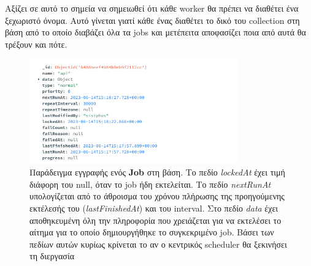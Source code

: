 Αξίζει σε αυτό το σημεία να σημειωθεί ότι κάθε worker θα πρέπει να διαθέτει ένα ξεχωριστό όνομα.
Αυτό γίνεται γιατί κάθε ένας διαθέτει το δικό του collection στη βάση από το οποίο διαβάζει όλα τα jobs
και μετέπειτα αποφασίζει ποια από αυτά θα τρέξουν και πότε.

\begin{figure}[!ht]
	\centering
	\includegraphics[width=0.8\textwidth]{./images/chapter4/sample_job_document.png}
	\caption[Παράδειγμα εγγραφής ενός \textbf{Job} στη βάση]{Παράδειγμα εγγραφής ενός \textbf{Job} στη βάση. Tο πεδίο \textit{lockedAt} έχει τιμή διάφορη του null, όταν το job ήδη εκτελείται.
		Το πεδίο \textit{nextRunAt} υπολογίζεται από το άθροισμα του χρόνου πλήρωσης της προηγούμενης εκτέλεσής του (\textit{lastFinishedAt}) και του interval. Στο πεδίο \textit{data}
		έχει αποθηκευμένη όλη την πληροφορία που χρειάζεται για να εκτελέσει το αίτημα για το οποίο δημιουργήθηκε το συγκεκριμένο job. Βάσει των πεδίων αυτών κυρίως κρίνεται το αν ο
		κεντρικός scheduler θα ξεκινήσει τη διεργασία}
	\label{fig:sample_job_document}
\end{figure}




